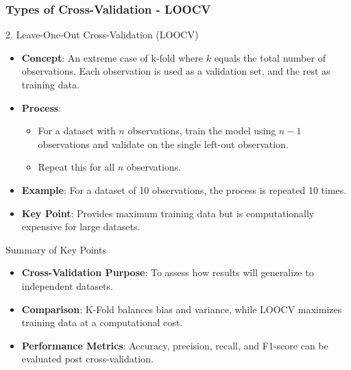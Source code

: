 \documentclass[aspectratio=169]{beamer}
\begin{document}
\begin{frame}[fragile]
    \frametitle{Types of Cross-Validation - LOOCV}
    \begin{block}{2. Leave-One-Out Cross-Validation (LOOCV)}
        \begin{itemize}
            \item \textbf{Concept}: An extreme case of k-fold where $k$ equals the total number of observations. 
            Each observation is used as a validation set, and the rest as training data.
            \item \textbf{Process}:
            \begin{itemize}
                \item For a dataset with $n$ observations, train the model using $n-1$ observations 
                and validate on the single left-out observation.
                \item Repeat this for all $n$ observations.
            \end{itemize}
            \item \textbf{Example}: For a dataset of 10 observations, the process is repeated 10 times.
            \item \textbf{Key Point}: Provides maximum training data but is computationally expensive for large datasets.
        \end{itemize}
    \end{block}
    
    \begin{block}{Summary of Key Points}
        \begin{itemize}
            \item \textbf{Cross-Validation Purpose}: To assess how results will generalize to independent datasets.
            \item \textbf{Comparison}: K-Fold balances bias and variance, while LOOCV maximizes training data at a computational cost.
            \item \textbf{Performance Metrics}: Accuracy, precision, recall, and F1-score can be evaluated post cross-validation.
        \end{itemize}
    \end{block}
\end{frame}
\end{document}
